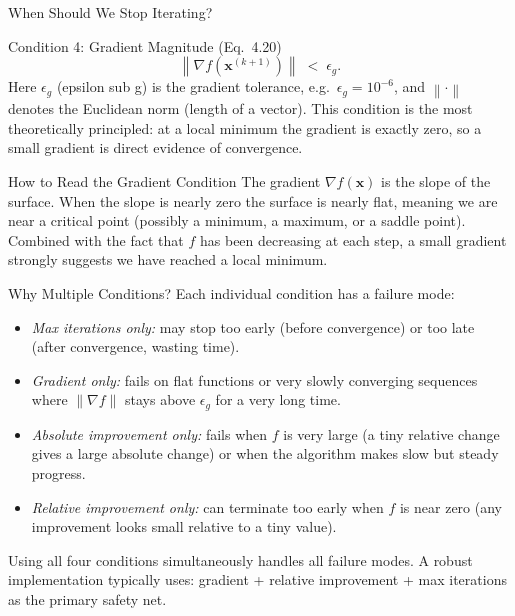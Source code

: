 \documentclass[aspectratio=169,10pt]{beamer}
\newcommand{\bx}{\mathbf{x}}
\newcommand{\grad}{\nabla}
\newcommand{\norm}[1]{\left\|#1\right\|}
\begin{document}
\begin{frame}[allowframebreaks]{When Should We Stop Iterating?}
  \begin{block}{Condition 4: Gradient Magnitude (Eq.\ 4.20)}
    \[
      \norm{\grad f(\bx^{(k+1)})} \;<\; \epsilon_g.
    \]
    Here $\epsilon_g$ (epsilon sub g) is the gradient tolerance, e.g.\
    $\epsilon_g = 10^{-6}$, and $\norm{\cdot}$ denotes the Euclidean
    norm (length of a vector).  This condition is the most theoretically
    principled: at a local minimum the gradient is exactly zero, so a
    small gradient is direct evidence of convergence.
  \end{block}

  \begin{alertblock}{How to Read the Gradient Condition}
    The gradient $\grad f(\bx)$ is the slope of the surface.  When the
    slope is nearly zero the surface is nearly flat, meaning we are
    near a critical point (possibly a minimum, a maximum, or a saddle
    point).  Combined with the fact that $f$ has been decreasing at
    each step, a small gradient strongly suggests we have reached a
    local minimum.
  \end{alertblock}

  \framebreak

  \begin{block}{Why Multiple Conditions?}
    Each individual condition has a failure mode:
    \begin{itemize}
      \item \emph{Max iterations only:} may stop too early (before
            convergence) or too late (after convergence, wasting time).
      \item \emph{Gradient only:} fails on flat functions or very
            slowly converging sequences where $\|\grad f\|$ stays
            above $\epsilon_g$ for a very long time.
      \item \emph{Absolute improvement only:} fails when $f$ is very
            large (a tiny relative change gives a large absolute change)
            or when the algorithm makes slow but steady progress.
      \item \emph{Relative improvement only:} can terminate too early
            when $f$ is near zero (any improvement looks small relative
            to a tiny value).
    \end{itemize}
    Using all four conditions simultaneously handles all failure modes.
    A robust implementation typically uses: gradient + relative improvement
    + max iterations as the primary safety net.
  \end{block}


\end{frame}
\end{document}
